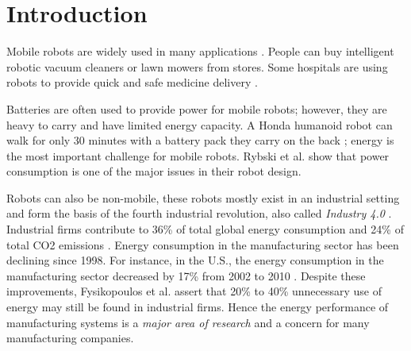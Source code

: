 \section{Introduction}
\label{sec:intro}

Mobile robots are widely used in many applications \cite{mei2005energy_consumers_identified}.
People can buy intelligent robotic vacuum cleaners or lawn mowers from stores. 
Some hospitals are using robots to provide quick and safe medicine delivery \cite{evans1994courier_hospital}.

Batteries are often used to provide power for mobile robots; however, they are heavy to carry and have limited energy capacity. 
A Honda humanoid robot can walk for only 30 minutes with a battery pack they carry on the back \cite{aylett2002machines_to_life}; 
energy is the most important challenge for mobile robots. 
Rybski et al. \cite{rybsky2000robot_rangers} show that power consumption is one of the major issues in their robot design.

Robots can also be non-mobile, these robots mostly exist in an industrial setting and form the basis of the fourth industrial revolution,
also called \textit{Industry 4.0} \cite{lasi2014industry4}. 
Industrial firms contribute to 36\% of total global energy consumption and 24\% of total CO2 emissions \cite{international2006energy}.
Energy consumption in the manufacturing sector has been declining since 1998. 
For instance, in the U.S., the energy consumption in the manufacturing sector decreased by 17\% from 2002 to 2010 \cite{US2018energy_administration}.
Despite these improvements, 
Fysikopoulos et al. \cite{fysikopoulos2012automotive_energy_consumption} assert that 20\% to 40\% unnecessary use of energy may still be found in industrial firms. 
Hence the energy performance of manufacturing systems is a \textit{major area of research} and a concern for many manufacturing companies.

